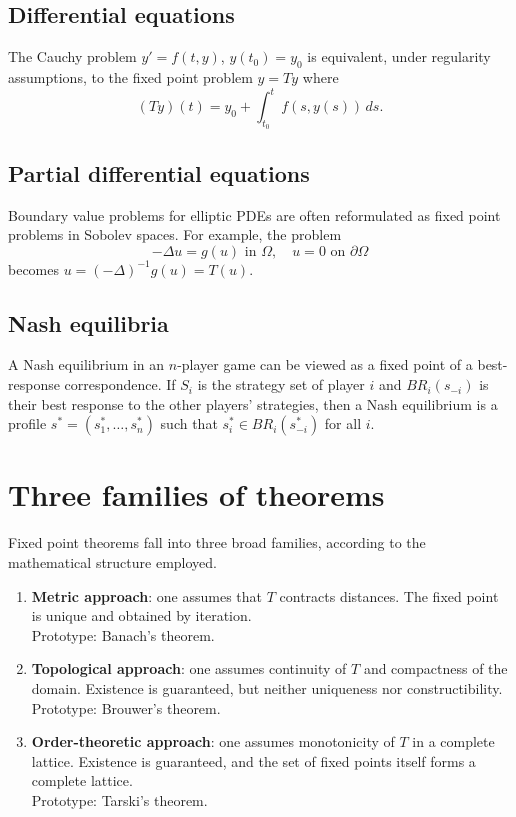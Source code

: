 \subsection{Differential equations}

The Cauchy problem $y' = f(t,y)$, $y(t_0) = y_0$ is equivalent, under
regularity assumptions, to the fixed point problem $y = Ty$ where
\[
    (Ty)(t) = y_0 + \int_{t_0}^t f(s, y(s)) \, ds.
\]

\subsection{Partial differential equations}

Boundary value problems for elliptic PDEs are often reformulated as fixed point
problems in Sobolev spaces. For example, the problem
\[
    -\Delta u = g(u) \text{ in } \Omega, \quad u = 0 \text{ on } \partial\Omega
\]
becomes $u = (-\Delta)^{-1} g(u) = T(u)$.

\subsection{Nash equilibria}

A Nash equilibrium in an $n$-player game can be viewed as a fixed point of a
best-response correspondence. If $S_i$ is the strategy set of player $i$ and
$BR_i(s_{-i})$ is their best response to the other players' strategies, then a
Nash equilibrium is a profile $s^* = (s_1^*, \ldots, s_n^*)$ such that
$s_i^* \in BR_i(s_{-i}^*)$ for all $i$.

\section{Three families of theorems}

Fixed point theorems fall into three broad families, according to the
mathematical structure employed.

\begin{intuition}[title=\textbf{The three approaches}]
\begin{enumerate}
    \item \textbf{Metric approach}: one assumes that $T$ contracts distances.
          The fixed point is unique and obtained by iteration. \\
          Prototype: Banach's theorem.
    \item \textbf{Topological approach}: one assumes continuity of $T$ and
          compactness of the domain. Existence is guaranteed, but neither
          uniqueness nor constructibility. \\
          Prototype: Brouwer's theorem.
    \item \textbf{Order-theoretic approach}: one assumes monotonicity of $T$ in
          a complete lattice. Existence is guaranteed, and the set of fixed
          points itself forms a complete lattice. \\
          Prototype: Tarski's theorem.
\end{enumerate}
\end{intuition}

